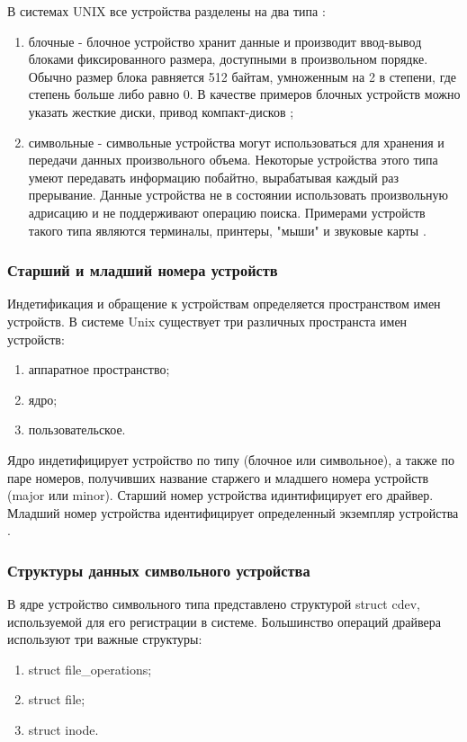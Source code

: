 В системах UNIX все устройства разделены на два типа \cite{5}:
\begin{enumerate}
	\item блочные - блочное устройство хранит данные и производит ввод-вывод блоками фиксированного размера, доступными в произвольном порядке.
	Обычно размер блока равняется 512 байтам, умноженным на 2 в степени, где степень больше либо равно 0.
	В качестве примеров блочных устройств можно указать жесткие диски, привод компакт-дисков \cite{5};
	\item символьные - символьные устройства могут использоваться для хранения и передачи данных произвольного объема. 
	Некоторые устройства этого типа умеют передавать информацию побайтно, вырабатывая каждый раз прерывание.
	Данные устройства не в состоянии использовать произвольную адрисацию и не поддерживают операцию поиска.
	Примерами устройств такого типа являются терминалы, принтеры, "мыши" и звуковые карты \cite{5}.
\end{enumerate}

\subsubsection{Старший и младший номера устройств}
Индетификация и обращение к устройствам определяется пространством имен устройств.
В системе Unix существует три различных пространста имен устройств:
\begin{enumerate}
	\item аппаратное пространство;
	\item ядро;
	\item пользовательское.
\end{enumerate}

Ядро индетифицирует устройство по типу (блочное или символьное), а также по паре номеров, получивших название старжего и младшего номера устройств (major или minor).
Старший номер устройства идинтифицирует его драйвер. 
Младший номер устройства идентифицирует определенный экземпляр устройства \cite{5}.

\subsubsection{Структуры данных символьного устройства}
В ядре устройство символьного типа представлено структурой struct cdev, используемой для его регистрации в системе.
Большинство операций драйвера используют три важные структуры:
\begin{enumerate}
	\item struct file\_operations;
	\item struct file;
	\item struct inode.
\end{enumerate}

